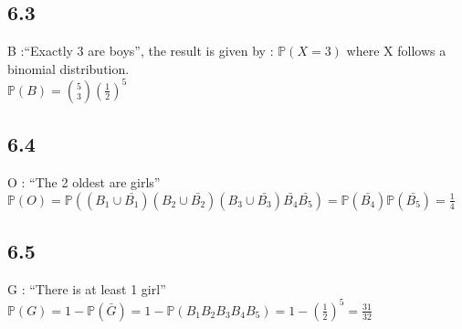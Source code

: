 \documentclass{article}
\begin{document}
    \subsection*{6.3}
    B :``Exactly 3 are boys'', the result is given by : $\mathbb{P}(X = 3)$ where X follows a binomial distribution.
    \\
    $\mathbb{P}(B) = \binom{5}{3}(\frac{1}{2})^5$
    \subsection*{6.4}
    O : ``The  2 oldest are girls''
    \\
    $\mathbb{P}(O) = \mathbb{P}((B_1\cup\bar{B_1})(B_2\cup\bar{B_2})(B_3\cup\bar{B_3})\bar{B_4}\bar{B_5}) = \mathbb{P}(\bar{B_4})\mathbb{P}(\bar{B_5})=\frac{1}{4}$
    \subsection*{6.5}
    G : ``There is at least 1 girl''
    \\
    $\mathbb{P}(G) = 1 - \mathbb{P}(\bar{G})=1 - \mathbb{P}(B_1B_2B_3B_4B_5) = 1 - (\frac{1}{2})^5  = \frac{31}{32}$
\end{document}

